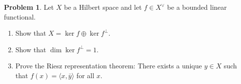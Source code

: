 \documentclass[11pt]{article}
\theoremstyle{definition}
\newtheorem{prob}{Problem}
\def\<{\langle}
\def\>{\rangle}
\begin{document}
\begin{prob}
Let $X$ be a Hilbert space and let $f \in X^\vee$ be a bounded linear
functional.
\begin{enumerate}
\item
Show that $X = \ker f \oplus \ker f^\perp$.

\item
Show that $\dim \ker f^\perp = 1$.

\item
Prove the Riesz representation theorem:
There exists a unique $y \in X$ such that $f(x) = \< x, \bar y \>$ for all $x$.
\end{enumerate}
\end{prob}
\end{document}
